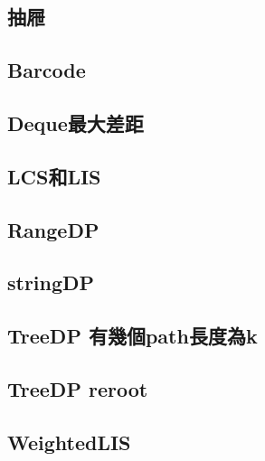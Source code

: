     \subsection{抽屜}
        
    \subsection{Barcode}
        
    \subsection{Deque最大差距}
        
    \subsection{LCS和LIS}
        
    \subsection{RangeDP}
        
    \subsection{stringDP}
        
    \subsection{TreeDP 有幾個path長度為k}
        
    \subsection{TreeDP reroot}
        
    \subsection{WeightedLIS}
        
    

%         